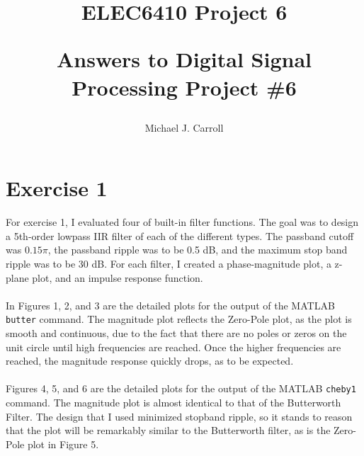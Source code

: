 \documentclass{article}
\title{ELEC6410 Project 6\\
 {\large \begin{par}
Answers to Digital Signal Processing Project \#6
\end{par}
}}
\author{Michael J. Carroll}
\begin{document}
\maketitle
           
\section*{Exercise 1}
\begin{par}
For exercise 1, I evaluated four of  built-in filter functions.  The goal was to design a 5th-order lowpass IIR filter of each of the different types.  The passband cutoff was $0.15\pi$, the passband ripple was to be 0.5 dB, and the maximum stop band ripple was to be 30 dB.  For each filter, I created a phase-magnitude plot, a z-plane plot, and an impulse response function.\\
\\
In Figures 1, 2, and 3 are the detailed plots for the output of the MATLAB \texttt{butter} command.  The magnitude plot reflects the Zero-Pole plot, as the plot is smooth and continuous, due to the fact that there are no poles or zeros on the unit circle until high frequencies are reached.  Once the higher frequencies are reached, the magnitude response quickly drops, as to be expected.\\
\\
Figures 4, 5, and 6 are the detailed plots for the output of the MATLAB \texttt{cheby1} command.  The magnitude plot is almost identical to that of the Butterworth Filter.  The design that I used minimized stopband ripple, so it stands to reason that the plot will be remarkably similar to the Butterworth filter, as is the Zero-Pole plot in Figure 5.\\
\end{par}
\end{document}
